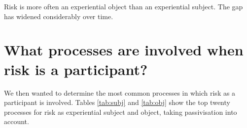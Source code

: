     \vspace{5mm}\noindent\begin{tcolorbox}[colback=yellow!5,colframe=yellow!40!black,title=Summary: risk as experiential subject\slash object]
    \parbox{1\textwidth}{%
    Risk is more often an experiential object than an experiential subject. The gap has widened considerably over time.}
    \end{tcolorbox}
    \vspace{5mm}



\section{What processes are involved when risk is a participant?} \FloatBarrier

    We then wanted to determine the most common processes in which risk as a participant is involved. Tables \ref{tab:subj} and \ref{tab:obj} show the top twenty processes for risk as experiential subject and object, taking passivisation into account.~


